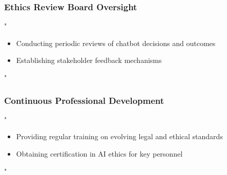 \documentclass[14pt,a4paper]{article}
\begin{document}
\textit{\parencite{ICO2024}}

\subsubsection*{Ethics Review Board Oversight}
"
\begin{itemize}
    \item Conducting periodic reviews of chatbot decisions and outcomes
    \item Establishing stakeholder feedback mechanisms
\end{itemize}
"

\textit{\parencite{AIEthicsBoard2024}}

\subsubsection*{Continuous Professional Development}
"
\begin{itemize}
    \item Providing regular training on evolving legal and ethical standards
    \item Obtaining certification in AI ethics for key personnel
\end{itemize}
"

\textit{\parencite{CIPD2024}}


\newpage

\printbibliography
\end{document}
